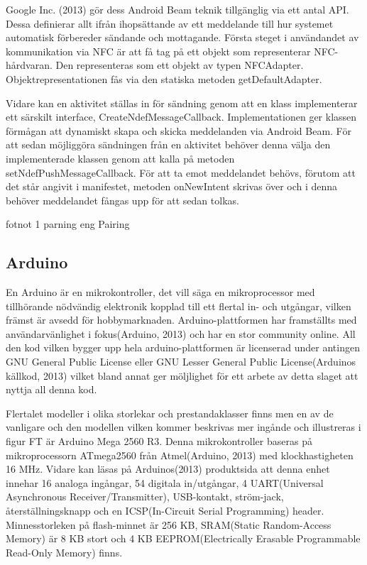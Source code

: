\documentclass[11pt]{article}
\begin{document}
Google Inc. (2013) gör dess Android Beam teknik tillgänglig via ett antal API. Dessa definierar allt ifrån ihopsättande av ett meddelande till hur systemet automatisk förbereder sändande och mottagande. Första steget i användandet av kommunikation via NFC är att få tag på ett objekt som representerar NFC-hårdvaran. Den representeras som ett objekt av typen NFCAdapter. Objektrepresentationen fås via den statiska metoden getDefaultAdapter.

Vidare kan en aktivitet ställas in för sändning genom att en klass implementerar ett särskilt interface, CreateNdefMessageCallback. Implementationen ger klassen förmågan att dynamiskt skapa och skicka meddelanden via Android Beam. För att sedan möjliggöra sändningen från en aktivitet behöver denna välja den implementerade klassen genom att kalla på metoden setNdefPushMessageCallback. För att ta emot meddelandet behövs, förutom att det står angivit i manifestet, metoden onNewIntent skrivas över och i denna behöver meddelandet fångas upp för att sedan tolkas.

fotnot 1 parning eng Pairing

\subsection{Arduino}
En Arduino är en mikrokontroller, det vill säga en mikroprocessor med tillhörande nödvändig elektronik kopplad till ett flertal in- och utgångar, vilken främst är avsedd för hobbymarknaden. Arduino-plattformen har framställts med användarvänlighet i fokus(Arduino, 2013) och har en stor community online. All den kod vilken bygger upp hela arduino-plattformen är licenserad under antingen GNU General Public License eller GNU Lesser General Public License(Arduinos källkod, 2013) vilket bland annat ger möljlighet för ett arbete av detta slaget att nyttja all denna kod. 

Flertalet modeller i olika storlekar och prestandaklasser finns men en av de vanligare och den modellen vilken kommer beskrivas mer ingånde och illustreras i figur FT är Arduino Mega 2560 R3. Denna mikrokontroller baseras på mikroprocessorn ATmega2560 från Atmel(Arduino, 2013) med klockhastigheten 16 MHz. Vidare kan läsas på Arduinos(2013) produktsida att denna enhet innehar 16 analoga ingångar, 54 digitala in/utgångar, 4 UART(Universal Asynchronous Receiver/Transmitter), USB-kontakt, ström-jack, återställningsknapp och en ICSP(In-Circuit Serial Programming) header. Minnesstorleken på flash-minnet är 256 KB, SRAM(Static Random-Access Memory) är 8 KB stort och 4 KB EEPROM(Electrically Erasable Programmable Read-Only Memory) finns.
\end{document}
